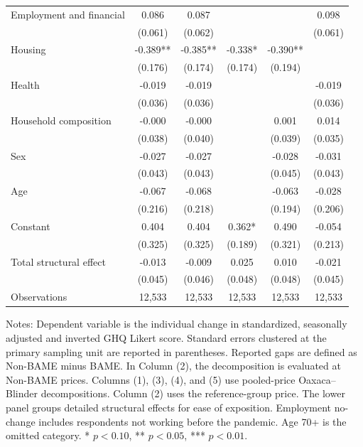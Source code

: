 \begin{table}
\begin{threeparttable}
\begin{tabular*}{\textwidth}{@{\extracolsep{\fill}}p{5.0cm}ccccc}
\hspace{0.1cm}Employment and financial & 0.086 & 0.087 &  &  & 0.098 \\
 & (0.061) & (0.062) &  &  & (0.061) \\
\hspace{0.1cm}Housing & -0.389** & -0.385** & -0.338* & -0.390** &  \\
 & (0.176) & (0.174) & (0.174) & (0.194) &  \\
\hspace{0.1cm}Health & -0.019 & -0.019 &  &  & -0.019 \\
 & (0.036) & (0.036) &  &  & (0.036) \\
\hspace{0.1cm}Household composition & -0.000 & -0.000 &  & 0.001 & 0.014 \\
 & (0.038) & (0.040) &  & (0.039) & (0.035) \\
\hspace{0.1cm}Sex & -0.027 & -0.027 &  & -0.028 & -0.031 \\
 & (0.043) & (0.043) &  & (0.045) & (0.043) \\
\hspace{0.1cm}Age & -0.067 & -0.068 &  & -0.063 & -0.028 \\
 & (0.216) & (0.218) &  & (0.194) & (0.206) \\
\hspace{0.1cm}Constant & 0.404 & 0.404 & 0.362* & 0.490 & -0.054 \\
 & (0.325) & (0.325) & (0.189) & (0.321) & (0.213) \\
Total structural effect & -0.013 & -0.009 & 0.025 & 0.010 & -0.021 \\
 & (0.045) & (0.046) & (0.048) & (0.048) & (0.045) \\
\addlinespace[0.3em]
Observations & 12,533 & 12,533 & 12,533 & 12,533 & 12,533 \\
\bottomrule
\end{tabular*}
\begin{tablenotes}[flushleft]
\scriptsize
\item Notes: Dependent variable is the individual change in standardized, seasonally adjusted and inverted GHQ Likert score. Standard errors clustered at the primary sampling unit are reported in parentheses. Reported gaps are defined as Non-BAME minus BAME. In Column (2), the decomposition is evaluated at Non-BAME prices. Columns (1), (3), (4), and (5) use pooled-price Oaxaca--Blinder decompositions. Column (2) uses the reference-group price. The lower panel groups detailed structural effects for ease of exposition. Employment no-change includes respondents not working before the pandemic. Age 70+ is the omitted category. * \(p<0.10\), ** \(p<0.05\), *** \(p<0.01\).
\end{tablenotes}
\end{threeparttable}
\end{table}